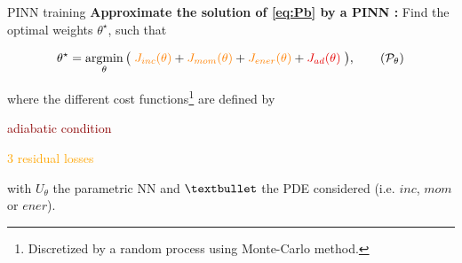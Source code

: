 \begin{frame}{PINN training}
    \vspace{-4pt}
    \textbf{Approximate the solution of \eqref{eq:Pb} by a PINN :} Find the optimal weights $\theta^\star$, such that
	
    \vspace{-8pt}
    \begin{equation}
		\label{eq:opt_pb}
		\theta^\star = \argmin_{\theta}	\big( \; \textcolor{orange}{J_{inc}(\theta)} + \textcolor{orange}{J_{mom}(\theta)} + \textcolor{orange}{J_{ener}(\theta)} + \textcolor{darkred}{J_{ad}(\theta)} \; \big),
		\tag{$\mathcal{P}_\theta$}
	\end{equation}

    \vspace{-2pt}
	where the different cost functions\footnote[frame,1]{Discretized by a random process using Monte-Carlo method.} are defined by
	\vspace{5pt}

	\begin{minipage}{0.24\linewidth}
		\centering
		\textcolor{darkred}{adiabatic condition}
        
		\vspace{12pt}
		\textcolor{orange}{$3$ residual losses}
	\end{minipage}
	\begin{minipage}{0.68\linewidth}
		\centering
        
        \vspace{3pt}
	\end{minipage}
    
    \vspace{5pt}
    with $U_\theta$ the parametric NN and $\textbullet$ the PDE considered (i.e. $inc$, $mom$ or $ener$).

    

\end{frame}
